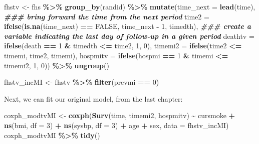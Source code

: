 \documentclass[
]{book}
\newenvironment{Shaded}{\begin{snugshade}}{\end{snugshade}}
\newcommand{\AttributeTok}[1]{\textcolor[rgb]{0.13,0.29,0.53}{#1}}
\newcommand{\ConstantTok}[1]{\textcolor[rgb]{0.56,0.35,0.01}{#1}}
\newcommand{\DecValTok}[1]{\textcolor[rgb]{0.00,0.00,0.81}{#1}}
\newcommand{\DocumentationTok}[1]{\textcolor[rgb]{0.56,0.35,0.01}{\textbf{\textit{#1}}}}
\newcommand{\FunctionTok}[1]{\textcolor[rgb]{0.13,0.29,0.53}{\textbf{#1}}}
\newcommand{\NormalTok}[1]{#1}
\newcommand{\OtherTok}[1]{\textcolor[rgb]{0.56,0.35,0.01}{#1}}
\newcommand{\SpecialCharTok}[1]{\textcolor[rgb]{0.81,0.36,0.00}{\textbf{#1}}}
\begin{document}
\begin{Shaded}
\begin{Highlighting}[]
\NormalTok{fhstv }\OtherTok{\textless{}{-}}\NormalTok{ fhs }\SpecialCharTok{\%\textgreater{}\%}
  \FunctionTok{group\_by}\NormalTok{(randid) }\SpecialCharTok{\%\textgreater{}\%}
  \FunctionTok{mutate}\NormalTok{(}\AttributeTok{time\_next =} \FunctionTok{lead}\NormalTok{(time), }\DocumentationTok{\#\#\# bring forward the time from the next period}
         \AttributeTok{time2 =} \FunctionTok{ifelse}\NormalTok{(}\FunctionTok{is.na}\NormalTok{(time\_next) }\SpecialCharTok{==} \ConstantTok{FALSE}\NormalTok{,}
\NormalTok{                        time\_next }\SpecialCharTok{{-}} \DecValTok{1}\NormalTok{,}
\NormalTok{                        timedth), }\DocumentationTok{\#\#\# create a variable indicating the last day of follow{-}up in a given period}
         \AttributeTok{deathtv =} \FunctionTok{ifelse}\NormalTok{(death }\SpecialCharTok{==} \DecValTok{1} \SpecialCharTok{\&}\NormalTok{ timedth }\SpecialCharTok{\textless{}=}\NormalTok{ time2, }\DecValTok{1}\NormalTok{, }\DecValTok{0}\NormalTok{),}
         \AttributeTok{timemi2 =} \FunctionTok{ifelse}\NormalTok{(time2 }\SpecialCharTok{\textless{}=}\NormalTok{ timemi, time2, timemi),}
         \AttributeTok{hospmitv =} \FunctionTok{ifelse}\NormalTok{(hospmi }\SpecialCharTok{==} \DecValTok{1} \SpecialCharTok{\&}\NormalTok{ timemi }\SpecialCharTok{\textless{}=}\NormalTok{ timemi2, }\DecValTok{1}\NormalTok{, }\DecValTok{0}\NormalTok{)) }\SpecialCharTok{\%\textgreater{}\%} 
  \FunctionTok{ungroup}\NormalTok{()}

\NormalTok{fhstv\_incMI }\OtherTok{\textless{}{-}}\NormalTok{ fhstv }\SpecialCharTok{\%\textgreater{}\%}
  \FunctionTok{filter}\NormalTok{(prevmi }\SpecialCharTok{==} \DecValTok{0}\NormalTok{) }
\end{Highlighting}
\end{Shaded}

Next, we can fit our original model, from the last chapter:

\begin{Shaded}
\begin{Highlighting}[]
\NormalTok{coxph\_modtvMI }\OtherTok{\textless{}{-}} \FunctionTok{coxph}\NormalTok{(}\FunctionTok{Surv}\NormalTok{(time, timemi2, hospmitv) }\SpecialCharTok{\textasciitilde{}} 
\NormalTok{                         cursmoke }\SpecialCharTok{+} \FunctionTok{ns}\NormalTok{(bmi, }\AttributeTok{df =} \DecValTok{3}\NormalTok{) }\SpecialCharTok{+} 
                         \FunctionTok{ns}\NormalTok{(sysbp, }\AttributeTok{df =} \DecValTok{3}\NormalTok{) }\SpecialCharTok{+}\NormalTok{ age }\SpecialCharTok{+}\NormalTok{ sex, }
                              \AttributeTok{data =}\NormalTok{ fhstv\_incMI)}
\NormalTok{coxph\_modtvMI }\SpecialCharTok{\%\textgreater{}\%}
  \FunctionTok{tidy}\NormalTok{()}
\end{Highlighting}
\end{Shaded}
\end{document}
